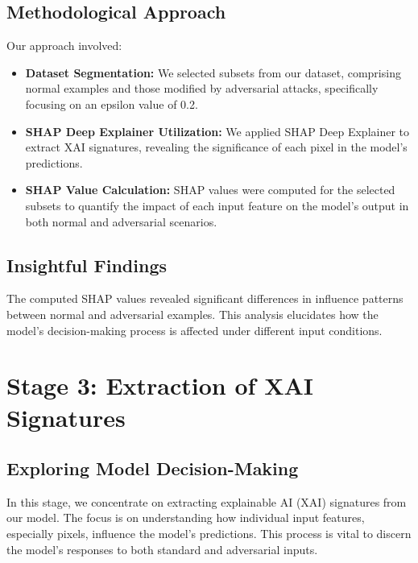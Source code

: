 \documentclass[10pt, conference, a4paper, final]{IEEEtran}
\begin{document}
\subsection{Methodological Approach}
Our approach involved:
\begin{itemize}
    \item \textbf{Dataset Segmentation:} We selected subsets from our dataset, comprising normal examples and those modified by adversarial attacks, specifically focusing on an epsilon value of 0.2.
    \item \textbf{SHAP Deep Explainer Utilization:} We applied SHAP Deep Explainer to extract XAI signatures, revealing the significance of each pixel in the model’s predictions.
    \item \textbf{SHAP Value Calculation:} SHAP values were computed for the selected subsets to quantify the impact of each input feature on the model's output in both normal and adversarial scenarios.
\end{itemize}

\subsection{Insightful Findings}
The computed SHAP values revealed significant differences in influence patterns between normal and adversarial examples. This analysis elucidates how the model's decision-making process is affected under different input conditions.



\section{Stage 3: Extraction of XAI Signatures}

\subsection{Exploring Model Decision-Making}
In this stage, we concentrate on extracting explainable AI (XAI) signatures from our model. The focus is on understanding how individual input features, especially pixels, influence the model's predictions. This process is vital to discern the model's responses to both standard and adversarial inputs.
\end{document}
